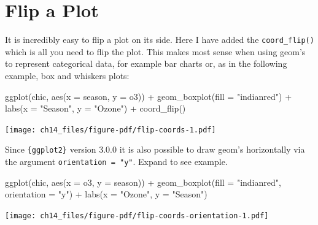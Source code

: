 \documentclass[
  letterpaper,
]{scrbook}
\newenvironment{Shaded}{\begin{snugshade}}{\end{snugshade}}
\newcommand{\AttributeTok}[1]{\textcolor[rgb]{0.40,0.45,0.13}{#1}}
\newcommand{\FunctionTok}[1]{\textcolor[rgb]{0.28,0.35,0.67}{#1}}
\newcommand{\NormalTok}[1]{\textcolor[rgb]{0.00,0.23,0.31}{#1}}
\newcommand{\SpecialCharTok}[1]{\textcolor[rgb]{0.37,0.37,0.37}{#1}}
\newcommand{\StringTok}[1]{\textcolor[rgb]{0.13,0.47,0.30}{#1}}
\begin{document}
\section{Flip a Plot}\label{flip-a-plot}

It is incredibly easy to flip a plot on its side. Here I have added the
\texttt{coord\_flip()} which is all you need to flip the plot. This
makes most sense when using geom's to represent categorical data, for
example bar charts or, as in the following example, box and whiskers
plots:

\begin{Shaded}
\begin{Highlighting}[]
\FunctionTok{ggplot}\NormalTok{(chic, }\FunctionTok{aes}\NormalTok{(}\AttributeTok{x =}\NormalTok{ season, }\AttributeTok{y =}\NormalTok{ o3)) }\SpecialCharTok{+}
  \FunctionTok{geom\_boxplot}\NormalTok{(}\AttributeTok{fill =} \StringTok{"indianred"}\NormalTok{) }\SpecialCharTok{+}
  \FunctionTok{labs}\NormalTok{(}\AttributeTok{x =} \StringTok{"Season"}\NormalTok{, }\AttributeTok{y =} \StringTok{"Ozone"}\NormalTok{) }\SpecialCharTok{+}
  \FunctionTok{coord\_flip}\NormalTok{()}
\end{Highlighting}
\end{Shaded}

\texttt{[image: ch14\_files/figure-pdf/flip-coords-1.pdf]}

\begin{tcolorbox}[enhanced jigsaw, rightrule=.15mm, arc=.35mm, title=\textcolor{quarto-callout-note-color}{\faInfo}\hspace{0.5em}{Using \texttt{orientation\ =\ "y"}}, colback=white, toptitle=1mm, colbacktitle=quarto-callout-note-color!10!white, breakable, left=2mm, opacityback=0, leftrule=.75mm, bottomrule=.15mm, bottomtitle=1mm, colframe=quarto-callout-note-color-frame, coltitle=black, toprule=.15mm, opacitybacktitle=0.6, titlerule=0mm]

Since \texttt{\{ggplot2\}} version 3.0.0 it is also possible to draw
geom's horizontally via the argument \texttt{orientation\ =\ "y"}.
Expand to see example.

\begin{Shaded}
\begin{Highlighting}[]
\FunctionTok{ggplot}\NormalTok{(chic, }\FunctionTok{aes}\NormalTok{(}\AttributeTok{x =}\NormalTok{ o3, }\AttributeTok{y =}\NormalTok{ season)) }\SpecialCharTok{+}
  \FunctionTok{geom\_boxplot}\NormalTok{(}\AttributeTok{fill =} \StringTok{"indianred"}\NormalTok{, }\AttributeTok{orientation =} \StringTok{"y"}\NormalTok{) }\SpecialCharTok{+}
  \FunctionTok{labs}\NormalTok{(}\AttributeTok{x =} \StringTok{"Ozone"}\NormalTok{, }\AttributeTok{y =} \StringTok{"Season"}\NormalTok{)}
\end{Highlighting}
\end{Shaded}

\texttt{[image: ch14\_files/figure-pdf/flip-coords-orientation-1.pdf]}

\end{tcolorbox}
\end{document}
